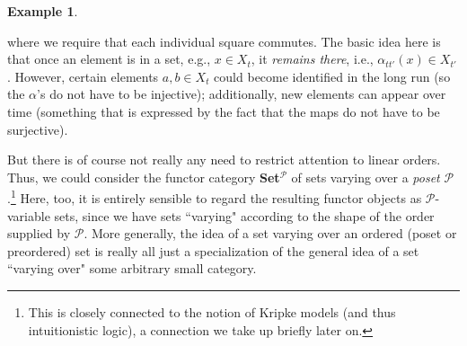 \documentclass[11pt]{book}
\theoremstyle{definition}
\newtheorem{example}{Example}[section]
\theoremstyle{definition}
\theoremstyle{definition}
\theoremstyle{theorem}
\theoremstyle{definition}
\begin{document}
\begin{example}
\begin{center}
		\end{center} 
		where we require that each individual square commutes. The basic idea here is that once an element is in a set, e.g., $ x \in X_t$, it \textit{remains there}, i.e., $\alpha_{tt'}(x) \in X_{t'}$. However, certain elements $a, b \in X_t$ could become identified in the long run (so the $\alpha$'s do not have to be injective); additionally, new elements can appear over time (something that is expressed by the fact that the maps do not have to be surjective). \par 
		But there is of course not really any need to restrict attention to linear orders. Thus, we could consider the functor category \textbf{Set}$^{\mathcal{P}}$ of sets varying over a \textit{poset} $\mathcal{P}$.\footnote{This is closely connected to the notion of Kripke models (and thus intuitionistic logic), a connection we take up briefly later on.} Here, too, it is entirely sensible to regard the resulting functor objects as $\mathcal{P}$-variable sets, since we have sets ``varying" according to the shape of the order supplied by $\mathcal{P}$. More generally, the idea of a set varying over an ordered (poset or preordered) set is really all just a specialization of the general idea of a set ``varying over" some arbitrary small category. 
	\end{example}
\end{document}
